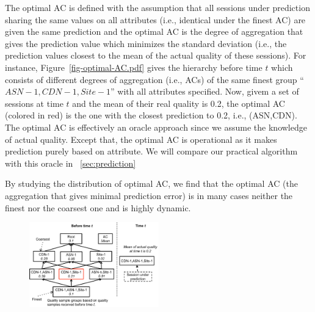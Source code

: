 The optimal AC is defined with the assumption that all sessions under prediction sharing the same values on all attributes (i.e., identical under the finest AC) are given the same prediction and the optimal AC is the degree of aggregation that gives the prediction value which minimizes the standard deviation (i.e., the prediction values closest to the mean of the actual quality of these sessions). For instance, Figure~\ref{fig-optimal-AC.pdf} gives the hierarchy before time $t$ which consists of different degrees of aggregation (i.e., ACs) of the same finest group ``$ASN-1,CDN-1,Site-1$'' with all attributes specified. Now, givem a set of sessions at time $t$ and the mean of their real quality is 0.2, the optimal AC (colored in red) is the one with the closest prediction to 0.2, i.e., (ASN,CDN). The optimal AC is effectively an oracle approach since we assume the knowledge of actual quality. Except that, the optimal AC is operational as it makes prediction purely based on attribute. We will compare our practical algorithm with this oracle in \Section~\ref{sec:prediction}

By studying the distribution of optimal AC, we find that the optimal AC (the aggregation that gives minimal prediction error) is in many cases neither the finest nor the coarsest one and is highly dynamic. 



\begin{figure}[h!]
\centering
 \includegraphics[width=0.5\textwidth] {figures/fig-optimal-AC.pdf}
\label{fig:example-optimal-ac}
\end{figure}

